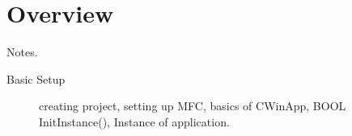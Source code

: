 \section{Overview}
Notes.
\begin{description}
    \item[Basic Setup] creating project, setting up MFC, basics of CWinApp, BOOL InitInstance(), Instance of application.
    \item[]  
\end{description}

